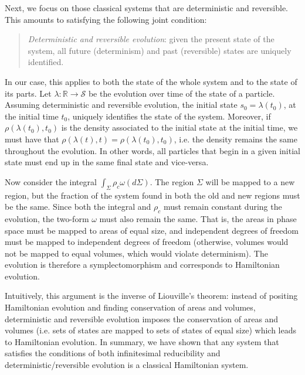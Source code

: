 \documentclass[letterpaper]{article}
\begin{document}
Next, we focus on those classical systems that are deterministic and reversible. This amounts to satisfying the following joint condition:

\begin{quotation}
\noindent
\textit{Deterministic and reversible evolution}: given the present state of the system, all future (determinism) and past (reversible) states are uniquely identified.

\end{quotation}

In our case, this applies to both the state of the whole system and to the state of its parts. Let $\lambda: \mathbb{R} \to \mathcal{S}$ be the evolution over time of the state of a particle. Assuming deterministic and reversible evolution, the initial state $s_0 = \lambda(t_0)$, at the initial time $t_0$, uniquely identifies the state of the system. Moreover, if $\rho(\lambda(t_0), t_0)$ is the density associated to the initial state at the initial time, we must have that $\rho(\lambda(t), t) = \rho(\lambda(t_0), t_0)$, i.e. the density remains the same throughout the evolution. In other words, all particles that begin in a given initial state must end up in the same final state and vice-versa.  

Now consider the integral $\int_{\Sigma} \rho_c \omega(d\Sigma)$. The region $\Sigma$ will be mapped to a new region, but the fraction of the system found in both the old and new regions must be the same. Since both the integral and $\rho_c$ must remain constant during the evolution, the two-form $\omega$ must also remain the same. That is, the areas in phase space must be mapped to areas of equal size, and independent degrees of freedom must be mapped to independent degrees of freedom (otherwise, volumes would not be mapped to equal volumes, which would violate determinism). The evolution is therefore a symplectomorphism and corresponds to Hamiltonian evolution. 

Intuitively, this argument is the inverse of Liouville's theorem: instead of positing Hamiltonian evolution and finding conservation of areas and volumes, deterministic and reversible evolution imposes the conservation of areas and volumes (i.e. sets of states are mapped to sets of states of equal size) which leads to Hamiltonian evolution. In summary, we have shown that any system that satisfies the conditions of both infinitesimal reducibility and deterministic/reversible evolution is a classical Hamiltonian system.
\end{document}
